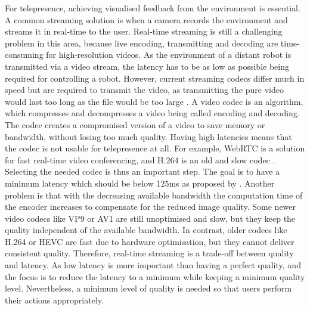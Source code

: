 For telepresence, achieving visualised feedback from the environment is essential. A common streaming solution is when a camera records the environment and streams it in real-time to the user. Real-time streaming is still a challenging problem in this area, because live encoding, transmitting and decoding are time-consuming for high-resolution videos. As the environment of a distant robot is transmitted via a video stream, the latency has to be as low as possible being required for controlling a robot. However, current streaming codecs differ much in speed but are required to transmit the video, as transmitting the pure video would last too long as the file would be too large \parencite{Minopoulos2020} . A video codec is an algorithm, which compresses and decompresses a video being called encoding and decoding. The codec creates a compromised version of a video to save memory or bandwidth, without losing too much quality. Having high latencies means that the codec is not usable for telepresence at all. For example, WebRTC is a solution for fast real-time video conferencing, and H.264 is an old and slow codec \parencite{Jansen2018}. Selecting the needed codec is thus an important step. The goal is to have a minimum latency which should be below 125ms as proposed by \cite{Waltemate2016}. Another problem is that with the decreasing available bandwidth the computation time of the encoder increases to compensate for the reduced image quality. Some newer video codecs like VP9 \parencite{WebM2020} or AV1 \parencite{AO2020} are still unoptimised and slow, but they keep the quality independent of the available bandwidth. In contrast, older codecs like H.264 or HEVC \parencite{MPEG2020} are fast due to hardware optimisation, but they cannot deliver consistent quality. Therefore, real-time streaming is a trade-off between quality and latency. As low latency is more important than having a perfect quality, and the focus is to reduce the latency to a minimum while keeping a minimum quality level. Nevertheless, a minimum level of quality is needed so that users perform their actions appropriately.

